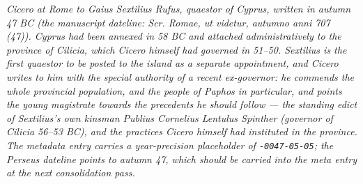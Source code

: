 
\textit{Cicero at Rome to Gaius Sextilius Rufus, quaestor of
Cyprus, written in autumn 47 BC (the manuscript dateline:
\textit{Scr. Romae, ut videtur, autumno anni 707 (47)}). Cyprus
had been annexed in 58 BC and attached administratively to the
province of Cilicia, which Cicero himself had governed in 51--50.
Sextilius is the first quaestor to be posted to the island as a
separate appointment, and Cicero writes to him with the special
authority of a recent ex-governor: he commends the whole
provincial population, and the people of Paphos in particular,
and points the young magistrate towards the precedents he should
follow --- the standing edict of Sextilius's own kinsman
Publius Cornelius Lentulus Spinther (governor of Cilicia
56--53 BC), and the practices Cicero himself had instituted in
the province. The metadata entry carries a year-precision
placeholder of \texttt{-0047-05-05}; the Perseus dateline points
to autumn 47, which should be carried into the meta entry at
the next consolidation pass.}
